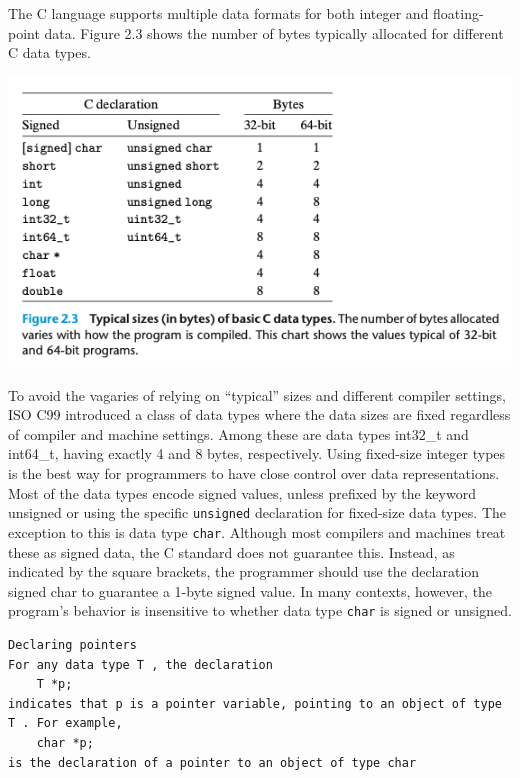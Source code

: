 \documentclass[11pt]{article}
\begin{document}
The C language supports multiple data formats for both integer and floating-point data. Figure 2.3 shows the number of bytes typically allocated for different C data types.\\

\begin{center}
\includegraphics[width=.9\linewidth]{pics/typical-data-sizes-of-basic-c-data-types.png}
\end{center}


To avoid the vagaries of relying on “typical” sizes and different compiler settings, ISO C99 introduced a class of data types where the data sizes are fixed regardless of compiler and machine settings. Among these are data types int32\_t and int64\_t, having exactly 4 and 8 bytes, respectively. Using fixed-size integer types is the best way for programmers to have close control over data representations.\\

Most of the data types encode signed values, unless prefixed by the keyword unsigned or using the specific \texttt{unsigned} declaration for fixed-size data types. The exception to this is data type \texttt{char}. Although most compilers and machines treat these as signed data, the C standard does not guarantee this. Instead, as indicated by the square brackets, the programmer should use the declaration signed char to guarantee a 1-byte signed value. In many contexts, however, the program’s behavior is insensitive to whether data type \texttt{char} is signed or unsigned.\\


\begin{verbatim}
Declaring pointers 
For any data type T , the declaration
    T *p;
indicates that p is a pointer variable, pointing to an object of type T . For example,
    char *p;
is the declaration of a pointer to an object of type char
\end{verbatim}
\end{document}
